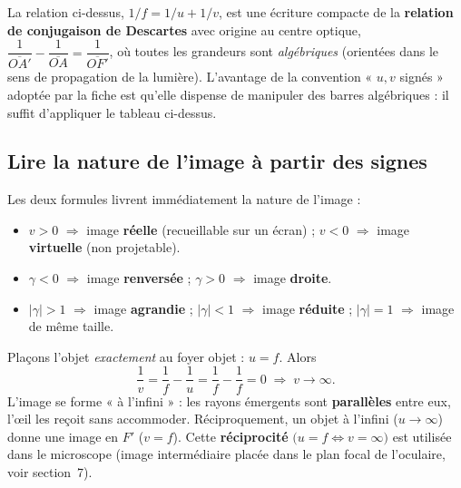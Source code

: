 \documentclass[11pt,a4paper]{article}
\newcommand{\gamm}{\gamma}             %
\begin{document}
\begin{remarque}
La relation ci-dessus, $1/f=1/u+1/v$, est une écriture compacte de la \textbf{relation de conjugaison
de Descartes} avec origine au centre optique, $\dfrac{1}{\overline{OA'}}-\dfrac{1}{\overline{OA}}
=\dfrac{1}{\overline{OF'}}$, où toutes les grandeurs sont \emph{algébriques} (orientées dans le sens
de propagation de la lumière). L'avantage de la convention « $u,v$ signés » adoptée par la fiche est
qu'elle dispense de manipuler des barres algébriques : il suffit d'appliquer le tableau ci-dessus.
\end{remarque}

\subsection{Lire la nature de l'image à partir des signes}

Les deux formules livrent immédiatement la nature de l'image :
\begin{itemize}[leftmargin=1.7em,topsep=2pt,itemsep=2pt]
  \item \textbf{$v>0$} $\Rightarrow$ image \textbf{réelle} (recueillable sur un écran) ; \textbf{$v<0$}
        $\Rightarrow$ image \textbf{virtuelle} (non projetable).
  \item \textbf{$\gamm<0$} $\Rightarrow$ image \textbf{renversée} ; \textbf{$\gamm>0$}
        $\Rightarrow$ image \textbf{droite}.
  \item \textbf{$|\gamm|>1$} $\Rightarrow$ image \textbf{agrandie} ; \textbf{$|\gamm|<1$}
        $\Rightarrow$ image \textbf{réduite} ; \textbf{$|\gamm|=1$} $\Rightarrow$ image de même taille.
\end{itemize}

\begin{exemple}
Plaçons l'objet \emph{exactement} au foyer objet : $u=f$. Alors
\[ \frac{1}{v}=\frac{1}{f}-\frac{1}{u}=\frac{1}{f}-\frac{1}{f}=0\;\Longrightarrow\;v\to\infty. \]
L'image se forme « à l'infini » : les rayons émergents sont \textbf{parallèles} entre eux, l'œil les
reçoit sans accommoder. Réciproquement, un objet à l'infini ($u\to\infty$) donne une image en $F'$
($v=f$). Cette \textbf{réciprocité} $\big(u=f \Leftrightarrow v=\infty\big)$ est utilisée dans le
microscope (image intermédiaire placée dans le plan focal de l'oculaire, voir section~7).
\end{exemple}

\end{document}

